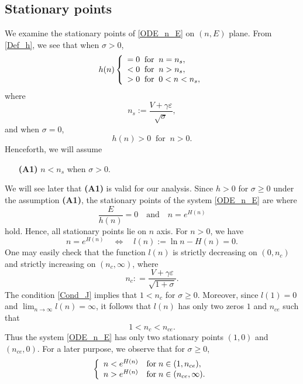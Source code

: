 \documentclass{amsart}
\newcommand{\veps}{\varepsilon}
\numberwithin{equation}{section}
\theoremstyle{plain}%
\theoremstyle{definition}
\theoremstyle{remark}
\theoremstyle{remark}
\begin{document}
\subsection{Stationary points}
We examine the stationary points of \eqref{ODE_n_E} on $(n,E)$ plane. From \eqref{Def_h}, we see that when $\sigma>0$, 
\begin{equation}\label{sign h}
h(n)
\left\{
\begin{array}{l l}
=0 \;\; \text{for} \;\; n=n_s, \\ 
<0 \;\; \text{for} \;\; n>n_s, \\
>0 \;\; \text{for} \;\; 0<n<n_s,
\end{array}
\right.
\end{equation}
where
\begin{equation}\label{Def n^s}
n_s:=\frac{V+\gamma\veps}{\sqrt{\sigma}},
\end{equation}
and when $\sigma=0$, 
\begin{equation}\label{sign h cold}
h(n)>0 \;\; \text{for} \;\; n>0.
\end{equation}
Henceforth, we will assume 
\begin{enumerate}
\item[\textbf{(A1)}] $n<n_s$ \quad when $\sigma>0$.
\end{enumerate}
We will see later that \textbf{(A1)} is valid for our analysis. Since $h>0$ for $\sigma \geq 0$ under the assumption \textbf{(A1)}, the stationary points of the system \eqref{ODE_n_E} are where 
\begin{equation}\label{Aux 8}
\frac{E}{h(n)} = 0 \quad \text{and} \quad  n=e^{H(n)}
\end{equation}
hold. Hence, all stationary points lie on $n$ axis. For $n>0$, we have
\begin{equation}\label{Aux 9}
n=e^{H(n)} \quad \Longleftrightarrow \quad  l(n):=\ln n - H(n)=0.
\end{equation}
One may easily check that the function $l(n)$ is strictly decreasing on $(0,n_c)$ and strictly increasing on $(n_c,\infty)$, where
\begin{equation}\label{Def n_c}
n_c: = \frac{V+\gamma\veps}{\sqrt{1+\sigma}}.
\end{equation}
The condition \eqref{Cond_J} implies that $1 < n_c$ for $\sigma\geq 0$. Moreover, since $l(1) = 0$ and $\lim_{n \to \infty}l(n) = \infty$, it follows that $l(n)$ has only two zeros $1$ and $n_{ce}$ such that
\begin{equation}\label{Aux 10}
1 <n_c< n_{ce}.
\end{equation}
Thus the system \eqref{ODE_n_E} has only two stationary points $(1,0)$ and $(n_{ce},0)$. For a later purpose, we observe that for $\sigma \geq 0$,
\begin{equation}\label{Aux 6}
\left\{
\begin{array}{l l}
n  <  e^{H(n)} \quad \text{for} \; n \in (1,n_{ce}), \\ 
n  >  e^{H(n)} \quad \text{for} \; n \in (n_{ce},\infty).
\end{array} 
\right.
\end{equation}
\end{document}
